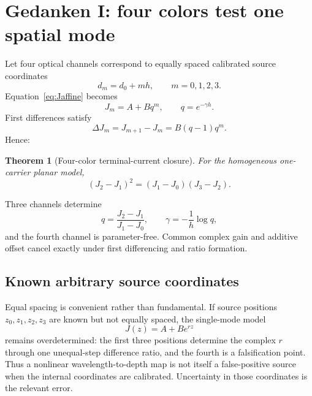 \documentclass[11pt]{article}
\newtheorem{theorem}{Theorem}
\begin{document}
\section{Gedanken I: four colors test one spatial mode}
Let four optical channels correspond to equally spaced calibrated source coordinates
\begin{equation}
d_m=d_0+mh,\qquad m=0,1,2,3.
\end{equation}
Equation~\eqref{eq:Jaffine} becomes
\begin{equation}
J_m=A+Bq^m,\qquad q=e^{-\gamma h}.
\end{equation}
First differences satisfy
\begin{equation}
\Delta J_m=J_{m+1}-J_m=B(q-1)q^m.
\end{equation}
Hence:
\begin{theorem}[Four-color terminal-current closure]
For the homogeneous one-carrier planar model,
\begin{equation}
\boxed{(J_2-J_1)^2=(J_1-J_0)(J_3-J_2).}
\label{eq:fourclosure}
\end{equation}
\end{theorem}
Three channels determine
\begin{equation}
q=\frac{J_2-J_1}{J_1-J_0},\qquad
\gamma=-\frac{1}{h}\log q,
\end{equation}
and the fourth channel is parameter-free. Common complex gain and additive offset cancel exactly under first differencing and ratio formation.

\subsection{Known arbitrary source coordinates}
Equal spacing is convenient rather than fundamental. If source positions $z_0,z_1,z_2,z_3$ are known but not equally spaced, the single-mode model
\begin{equation}
J(z)=A+B e^{rz}
\end{equation}
remains overdetermined: the first three positions determine the complex $r$ through one unequal-step difference ratio, and the fourth is a falsification point. Thus a nonlinear wavelength-to-depth map is not itself a false-positive source when the internal coordinates are calibrated. Uncertainty in those coordinates is the relevant error.
\end{document}
